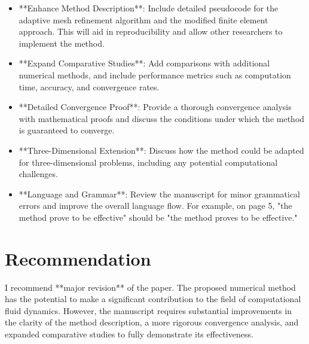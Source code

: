 \documentclass{article}
\begin{document}
\begin{itemize}
    \item **Enhance Method Description**: Include detailed pseudocode for the adaptive mesh refinement algorithm and the modified finite element approach. This will aid in reproducibility and allow other researchers to implement the method.

    \item **Expand Comparative Studies**: Add comparisons with additional numerical methods, and include performance metrics such as computation time, accuracy, and convergence rates.

    \item **Detailed Convergence Proof**: Provide a thorough convergence analysis with mathematical proofs and discuss the conditions under which the method is guaranteed to converge.

    \item **Three-Dimensional Extension**: Discuss how the method could be adapted for three-dimensional problems, including any potential computational challenges.

    \item **Language and Grammar**: Review the manuscript for minor grammatical errors and improve the overall language flow. For example, on page 5, "the method prove to be effective" should be "the method proves to be effective."

\end{itemize}

\section*{Recommendation}

I recommend **major revision** of the paper. The proposed numerical method has the potential to make a significant contribution to the field of computational fluid dynamics. However, the manuscript requires substantial improvements in the clarity of the method description, a more rigorous convergence analysis, and expanded comparative studies to fully demonstrate its effectiveness.
\end{document}
